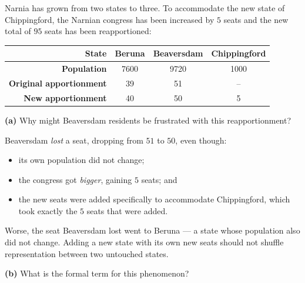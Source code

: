 \documentclass[12pt]{ximera}
\begin{document}
\begin{problem}
Narnia has grown from two states to three. To accommodate the new state of
Chippingford, the Narnian congress has been increased by $5$ seats and the new total of
$95$ seats has been reapportioned:

\begin{center}
\begin{tabular}{|r|c|c|c|}\hline
\textbf{State} & Beruna & Beaversdam & Chippingford \\\hline
\textbf{Population} & 7600 & 9720 & 1000 \\\hline
\textbf{Original apportionment} & 39 & 51 & -- \\\hline
\textbf{New apportionment} & 40 & 50 & 5 \\\hline
\end{tabular}
\end{center}

\begin{prompt}
\textbf{(a)} Why might Beaversdam residents be frustrated with this reapportionment?

\begin{freeResponse}
\end{freeResponse}

\begin{feedback}
Beaversdam \emph{lost} a seat, dropping from $51$ to $50$, even though:
\begin{itemize}
\item its own population did not change;
\item the congress got \emph{bigger}, gaining $5$ seats; and
\item the new seats were added specifically to accommodate Chippingford, which took
      exactly the $5$ seats that were added.
\end{itemize}
Worse, the seat Beaversdam lost went to Beruna --- a state whose population also did
not change. Adding a new state with its own new seats should not shuffle
representation between two untouched states.
\end{feedback}
\end{prompt}

\begin{prompt}
\textbf{(b)} What is the formal term for this phenomenon?

\begin{multipleChoice}
\end{multipleChoice}


\end{prompt}
\end{problem}
\end{document}
